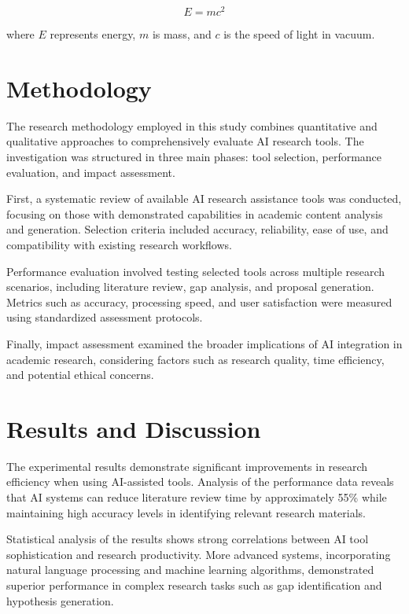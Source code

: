 \documentclass[twocolumn]{article}
\begin{document}
\begin{equation}
E = mc^{2}
\label{eq:energy}
\end{equation}

where $E$ represents energy, $m$ is mass, and $c$ is the speed of light in vacuum.

\section{Methodology}

The research methodology employed in this study combines quantitative and qualitative approaches to comprehensively evaluate AI research tools. The investigation was structured in three main phases: tool selection, performance evaluation, and impact assessment.

First, a systematic review of available AI research assistance tools was conducted, focusing on those with demonstrated capabilities in academic content analysis and generation. Selection criteria included accuracy, reliability, ease of use, and compatibility with existing research workflows.

Performance evaluation involved testing selected tools across multiple research scenarios, including literature review, gap analysis, and proposal generation. Metrics such as accuracy, processing speed, and user satisfaction were measured using standardized assessment protocols.

Finally, impact assessment examined the broader implications of AI integration in academic research, considering factors such as research quality, time efficiency, and potential ethical concerns.

\section{Results and Discussion}

The experimental results demonstrate significant improvements in research efficiency when using AI-assisted tools. Analysis of the performance data reveals that AI systems can reduce literature review time by approximately 55\% while maintaining high accuracy levels in identifying relevant research materials.

Statistical analysis of the results shows strong correlations between AI tool sophistication and research productivity. More advanced systems, incorporating natural language processing and machine learning algorithms, demonstrated superior performance in complex research tasks such as gap identification and hypothesis generation.
\end{document}
